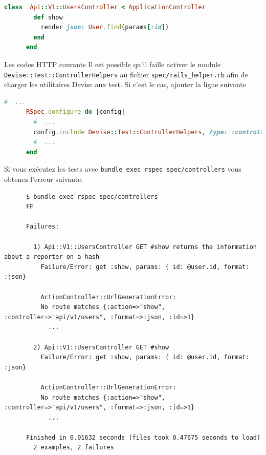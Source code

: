 \documentclass[]{report}
\begin{document}
    \begin{scriptsize}
      \begin{lstlisting}[language=ruby, caption={Le contrôlleur des utilisateurs avec l'action' 'show' (app/controllers/api/v1/users\_controller.rb)}, label={lst:add_show_to_users_controller_spec}]
      class  Api::V1::UsersController < ApplicationController
        def show
          render json: User.find(params[:id])
        end
      end
      \end{lstlisting}
    \end{scriptsize}

    \begin{tcolorbox}{Les codes HTTP courants}
      Il est possible qu'il faille activer le module \verb|Devise::Test::ControllerHelpers| au fichier \verb|spec/rails_helper.rb| afin de charger les utilitaires Devise aux test. Si c'est le cas, ajouter la ligne suivante

      \begin{scriptsize}
      \begin{lstlisting}[language=ruby]
      #  ...
      RSpec.configure do |config|
        #  ...
        config.include Devise::Test::ControllerHelpers, type: :controller
        #  ...
      end
      \end{lstlisting}
      \end{scriptsize}
    \end{tcolorbox}

    Si vous exécutez les tests avec \verb|bundle exec rspec spec/controllers| vous obtenez l'erreur suivante:

    \begin{scriptsize}
      \begin{lstlisting}
      $ bundle exec rspec spec/controllers
      FF

      Failures:

        1) Api::V1::UsersController GET #show returns the information about a reporter on a hash
          Failure/Error: get :show, params: { id: @user.id, format: :json}

          ActionController::UrlGenerationError:
          No route matches {:action=>"show", :controller=>"api/v1/users", :format=>:json, :id=>1}
            ...

        2) Api::V1::UsersController GET #show
          Failure/Error: get :show, params: { id: @user.id, format: :json}

          ActionController::UrlGenerationError:
          No route matches {:action=>"show", :controller=>"api/v1/users", :format=>:json, :id=>1}
            ...

      Finished in 0.01632 seconds (files took 0.47675 seconds to load)
        2 examples, 2 failures
      \end{lstlisting}
    \end{scriptsize}
\end{document}
